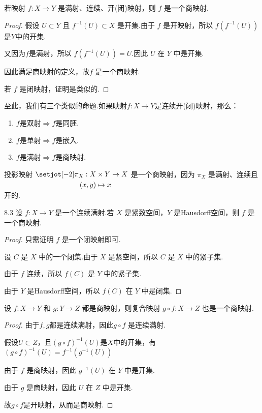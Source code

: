 \begin{proposition}
    若映射 $f:X\to Y$ 是满射、连续、开(闭)映射，则 $f$ 是一个商映射.
\end{proposition}
\begin{proof}
    假设 $U\subset Y$ 且 $f^{-1}(U)\subset X$ 是开集.由于 $f$ 是开映射，所以 $f(f^{-1}(U))$是$Y$中的开集.\par
    又因为$f$是满射，所以 $f(f^{-1}(U))=U$.因此 $U$ 在 $Y$ 中是开集.\par
    因此满足商映射的定义，故$f$ 是一个商映射.
    \par
    若 $f$ 是闭映射，证明是类似的.
\end{proof}
\begin{remark}
    至此，我们有三个类似的命题.如果映射$f:X\to Y$是连续开(闭)映射，那么：
    \begin{enumerate}
        \item $f$是双射$\Rightarrow f$是同胚.
        \item $f$是单射$\Rightarrow f$是嵌入.
        \item $f$是满射$\Rightarrow f$是商映射.
    \end{enumerate}
\end{remark}

\begin{instance}
    投影映射 $\setjot[-2]\begin{aligned}[t]
        \pi_X:X&\times Y\to X \\
        (x,y)&\mapsto x
    \end{aligned} $ 是一个商映射，因为 $\pi_X$ 是满射、连续且开的.
\end{instance}

\begin{proposition}{}{8.3}
    设 $f:X\to Y$ 是一个连续满射.若 $X$ 是紧致空间，$Y$ 是Hausdorff空间，则 $f$ 是一个商映射.
\end{proposition}
\begin{proof}
    只需证明 $f$ 是一个闭映射即可.
    \par
    设 $C$ 是 $X$ 中的一个闭集.由于 $X$ 是紧空间，所以 $C$ 是 $X$ 中的紧子集.
    \par
    由于 $f$ 连续，所以 $f(C)$ 是 $Y$ 中的紧子集.
    \par
    由于 $Y$ 是Hausdorff空间，所以 $f(C)$ 在 $Y$ 中是闭集.
\end{proof}

\begin{lemma}
    设 $f:X\to Y$ 和 $g:Y\to Z$ 都是商映射，则复合映射 $g\circ f:X\to Z$ 也是一个商映射.
\end{lemma}
\begin{proof}
    由于$f,g$都是连续满射，因此$g\circ f$ 是连续满射.\par
    假设$U\subset Z$，且$(g\circ f)^{-1}(U)$是$X$中的开集，有$(g\circ f)^{-1}(U)=f^{-1}\left(g^{-1}(U)\right)$\par
    由于 $f$ 是商映射，因此 $g^{-1}(U)$ 在 $Y$ 中是开集.
    \par
    由于 $g$ 是商映射，因此 $U$ 在 $Z$ 中是开集.\par
    故$g\circ f$是开映射，从而是商映射.
\end{proof}

